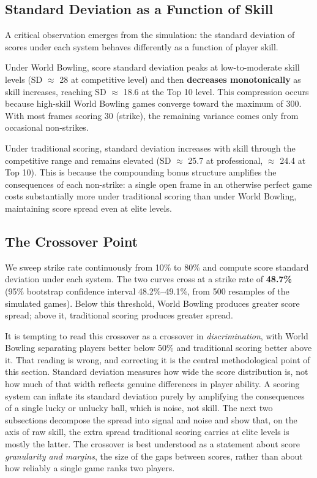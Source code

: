 \documentclass[
  letterpaper,
  DIV=11,
  numbers=noendperiod]{scrartcl}
\begin{document}
\subsection{Standard Deviation as a Function of
Skill}\label{standard-deviation-as-a-function-of-skill}

A critical observation emerges from the simulation: the standard
deviation of scores under each system behaves differently as a function
of player skill.

Under World Bowling, score standard deviation peaks at low-to-moderate
skill levels (SD \(\approx\) 28 at competitive level) and then
\textbf{decreases monotonically} as skill increases, reaching SD
\(\approx\) 18.6 at the Top 10 level. This compression occurs because
high-skill World Bowling games converge toward the maximum of 300. With
most frames scoring 30 (strike), the remaining variance comes only from
occasional non-strikes.

Under traditional scoring, standard deviation increases with skill
through the competitive range and remains elevated (SD \(\approx\) 25.7
at professional, \(\approx\) 24.4 at Top 10). This is because the
compounding bonus structure amplifies the consequences of each
non-strike: a single open frame in an otherwise perfect game costs
substantially more under traditional scoring than under World Bowling,
maintaining score spread even at elite levels.

\subsection{The Crossover Point}\label{the-crossover-point}

We sweep strike rate continuously from 10\% to 80\% and compute score
standard deviation under each system. The two curves cross at a strike
rate of \textbf{48.7\%} (95\% bootstrap confidence interval
48.2\%--49.1\%, from 500 resamples of the simulated games). Below this
threshold, World Bowling produces greater score spread; above it,
traditional scoring produces greater spread.

It is tempting to read this crossover as a crossover in
\emph{discrimination}, with World Bowling separating players better
below 50\% and traditional scoring better above it. That reading is
wrong, and correcting it is the central methodological point of this
section. Standard deviation measures how wide the score distribution is,
not how much of that width reflects genuine differences in player
ability. A scoring system can inflate its standard deviation purely by
amplifying the consequences of a single lucky or unlucky ball, which is
noise, not skill. The next two subsections decompose the spread into
signal and noise and show that, on the axis of raw skill, the extra
spread traditional scoring carries at elite levels is mostly the latter.
The crossover is best understood as a statement about score
\emph{granularity and margins}, the size of the gaps between scores,
rather than about how reliably a single game ranks two players.
\end{document}
